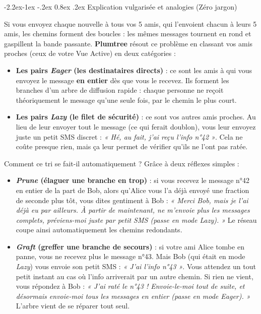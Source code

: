 \documentclass[11pt,a4paper]{article}
\makeatletter
\renewcommand\subsubsection{\@startsection{subsubsection}{3}{\z@}%
                                     {-2.2ex\@plus -1ex \@minus -.2ex}%
                                     {0.8ex \@plus .2ex}%
                                     {\normalfont\normalsize\bfseries\color{AccentTeal}}}
\makeatother
\begin{document}
\subsubsection{Explication vulgarisée et analogies (Zéro jargon)}

Si vous envoyez chaque nouvelle à tous vos 5 amis, qui l'envoient chacun à leurs 5 amis, les chemins forment des boucles : les mêmes messages tournent en rond et gaspillent la bande passante. \textbf{Plumtree} résout ce problème en classant vos amis proches (ceux de votre Vue Active) en deux catégories :

\begin{itemize}
    \item \textbf{Les pairs \emph{Eager} (les destinataires directs)} : ce sont les amis à qui vous envoyez le message \textbf{en entier} dès que vous le recevez. Ils forment les branches d'un arbre de diffusion rapide : chaque personne ne reçoit théoriquement le message qu'une seule fois, par le chemin le plus court.
    \item \textbf{Les pairs \emph{Lazy} (le filet de sécurité)} : ce sont vos autres amis proches. Au lieu de leur envoyer tout le message (ce qui ferait doublon), vous leur envoyez juste un petit SMS discret : \emph{« Hé, au fait, j'ai reçu l'info n°42 »}. Cela ne coûte presque rien, mais ça leur permet de vérifier qu'ils ne l'ont pas ratée.
\end{itemize}

Comment ce tri se fait-il automatiquement ? Grâce à deux réflexes simples :
\begin{itemize}
    \item \textbf{\emph{Prune} (élaguer une branche en trop)} : si vous recevez le message n°42 en entier de la part de Bob, alors qu'Alice vous l'a déjà envoyé une fraction de seconde plus tôt, vous dites gentiment à Bob : \emph{« Merci Bob, mais je l'ai déjà eu par ailleurs. À partir de maintenant, ne m'envoie plus les messages complets, préviens-moi juste par petit SMS (passe en mode Lazy). »} Le réseau coupe ainsi automatiquement les chemins redondants.
    \item \textbf{\emph{Graft} (greffer une branche de secours)} : si votre ami Alice tombe en panne, vous ne recevez plus le message n°43. Mais Bob (qui était en mode \emph{Lazy}) vous envoie son petit SMS : \emph{« J'ai l'info n°43 »}. Vous attendez un tout petit instant au cas où l'info arriverait par un autre chemin. Si rien ne vient, vous répondez à Bob : \emph{« J'ai raté le n°43 ! Envoie-le-moi tout de suite, et désormais envoie-moi tous les messages en entier (passe en mode Eager). »} L'arbre vient de se réparer tout seul.
\end{itemize}
\end{document}
